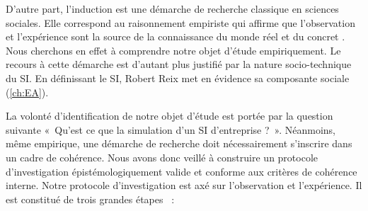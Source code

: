 	D'autre part, l'induction est une démarche de recherche classique en sciences 
sociales. Elle correspond au raisonnement empiriste qui affirme que 
l'observation et l'expérience sont la source de la connaissance du monde réel et 
du concret \cite{madeleine2001methodes}. Nous cherchons en effet à comprendre 
notre objet d'étude empiriquement. Le recours à cette démarche est d'autant plus 
justifié par la nature socio-technique du SI. En définissant le SI, Robert Reix 
met en évidence sa composante sociale (\ref{ch:EA}). 
	

	La volonté d'identification de notre objet d'étude est portée par la question 
suivante «~Qu'est ce que la simulation d'un SI d'entreprise ?~». Néanmoins, même 
empirique, une démarche de recherche doit nécessairement s'inscrire dans un 
cadre de cohérence. Nous avons donc veillé à construire un protocole 
d'investigation épistémologiquement valide et conforme aux critères de cohérence 
interne. Notre protocole d'investigation est axé sur l'observation et 
l'expérience. Il est constitué de trois grandes étapes ~:
		

